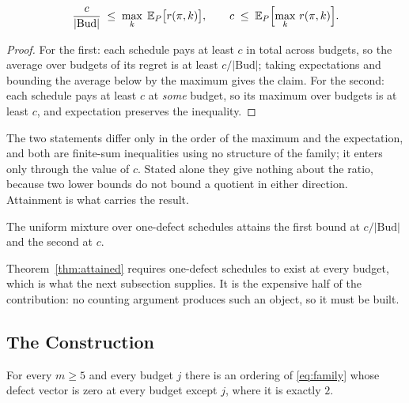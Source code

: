 \begin{theorem}
\label{thm:bounds}
\begin{equation}
\frac{c}{|\mathrm{Bud}|}\;\leq\;\max_{k}\;\mathbb{E}_{P}\bigl[r(\pi,k)\bigr],
\qquad
c\;\leq\;\mathbb{E}_{P}\Bigl[\max_{k}\,r(\pi,k)\Bigr].
\label{eq:bounds}
\end{equation}
\end{theorem}

\begin{proof}
For the first: each schedule pays at least $c$ in total across budgets, so the average over
budgets of its regret is at least $c/|\mathrm{Bud}|$; taking expectations and bounding the
average below by the maximum gives the claim. For the second: each schedule pays at least $c$
at \emph{some} budget, so its maximum over budgets is at least $c$, and expectation preserves
the inequality.
\end{proof}


The two statements differ only in the order of the maximum and the expectation, and both are
finite-sum inequalities using no structure of the family; it enters only through the value of
$c$. Stated alone they give nothing about the ratio, because two lower bounds do not bound a
quotient in either direction. Attainment is what carries the result.

\begin{theorem}
\label{thm:attained}
The uniform mixture over one-defect schedules attains the first bound at $c/|\mathrm{Bud}|$
and the second at $c$.
\end{theorem}


Theorem~\ref{thm:attained} requires one-defect schedules to exist at every budget, which is
what the next subsection supplies. It is the expensive half of the contribution: no counting
argument produces such an object, so it must be built.

\subsection{The Construction}
\label{sec:construction}

\begin{theorem}
\label{thm:construction}
For every $m\ge5$ and every budget $j$ there is an ordering of \eqref{eq:family} whose defect
vector is zero at every budget except $j$, where it is exactly $2$.
\end{theorem}

